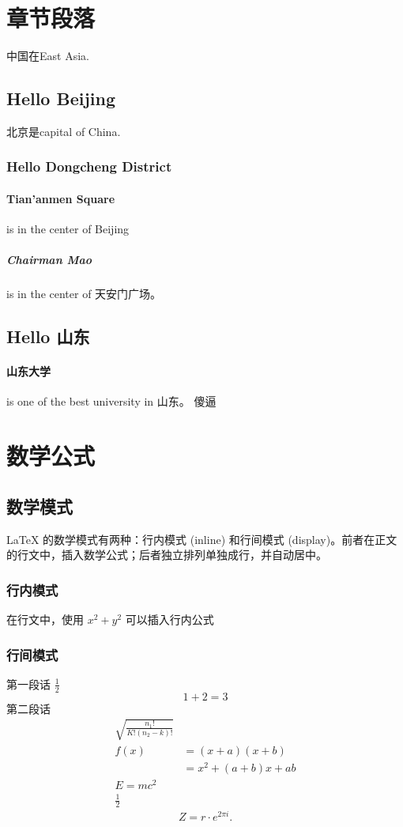 \documentclass[UTF8]{ctexart}
\begin{document}
\section{章节段落}
 中国在East Asia.
 \subsection{Hello Beijing}
     北京是capital of China.
     \subsubsection{Hello Dongcheng District}
         \paragraph{Tian'anmen Square}
             is in the center of Beijing
             \subparagraph{Chairman Mao}
                 is in the center of 天安门广场。
 \subsection{Hello 山东}
     \paragraph{山东大学} is one of the best university in 山东。
         傻逼
\section{数学公式}
 \subsection{数学模式}
     LaTeX 的数学模式有两种：行内模式 (inline) 和行间模式 (display)。前者在正文的行文中，插入数学公式；后者独立排列单独成行，并自动居中。
     \subsubsection{行内模式}
         在行文中，使用 $ x^2+y^2 $ 可以插入行内公式
     \subsubsection{行间模式}
         第一段话 $ \frac{1}{2} $
         \[1+2=3\]
         第二段话
         \begin{align}
             \sqrt{\frac{n_1!}{K!(n_2-k)!}} \\
             f(x) & = (x+a)(x+b)            \\
                  & = x^2 + (a+b)x + ab     \\
             E=mc^2                         \\
             \frac{1}{2}
         \end{align}
         \[Z=r\cdot e^{2\pi i}.\]
\end{document}
